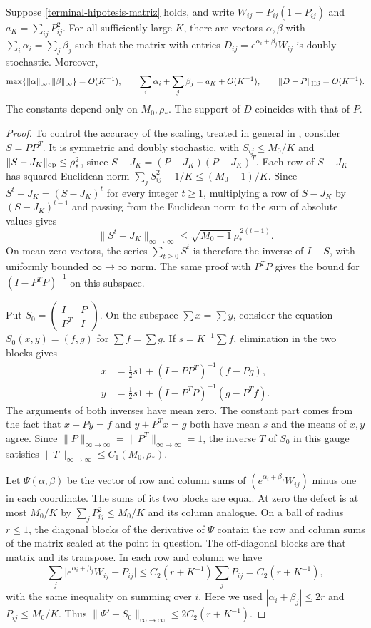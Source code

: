 \begin{lema}\label{terminal-escalado}
Suppose \eqref{terminal-hipotesis-matriz} holds, and write
$W_{ij}=P_{ij}(1-P_{ij})$ and $a_K=\sum_{ij}P_{ij}^2$. For all sufficiently large $K$, there are
vectors $\alpha,\beta$ with $\sum_i\alpha_i=\sum_j\beta_j$ such that the matrix with entries
$D_{ij}=e^{\alpha_i+\beta_j}W_{ij}$ is doubly stochastic. Moreover,
\[
 \max\{\|\alpha\|_\infty,\|\beta\|_\infty\}=O(K^{-1}),\qquad
 \sum_i\alpha_i+\sum_j\beta_j=a_K+O(K^{-1}),\qquad
 \|D-P\|_{\rm HS}=O(K^{-1}).
\]
The constants depend only on $M_0,\rho_*$. The support of $D$ coincides with that of $P$.
\end{lema}
\begin{proof}
To control the accuracy of the scaling, treated in general in \cite{sk}, consider $S=PP^T$.
It is symmetric and doubly stochastic, with $S_{ij}\le M_0/K$ and $\|S-J_K\|_{\rm op}\le\rho_*^2$,
since $S-J_K=(P-J_K)(P-J_K)^T$. Each row of $S-J_K$ has squared Euclidean norm
$\sum_j S_{ij}^2-1/K\le (M_0-1)/K$. Since $S^t-J_K=(S-J_K)^t$ for every integer $t\ge1$,
multiplying a row of $S-J_K$ by $(S-J_K)^{t-1}$ and passing from the Euclidean norm to the sum
of absolute values gives
\[
 \|S^t-J_K\|_{\infty\to\infty}
 \le \sqrt{M_0-1}\,\rho_*^{\,2(t-1)} .
\]
On mean-zero vectors, the series $\sum_{t\ge0}S^t$ is therefore the inverse of $I-S$, with
uniformly bounded $\infty\to\infty$ norm. The same proof with $P^TP$ gives the bound for
$(I-P^TP)^{-1}$ on this subspace.

Put $S_0=\left(\begin{smallmatrix}I&P\\P^T&I\end{smallmatrix}\right)$.
On the subspace $\sum x=\sum y$, consider the equation $S_0(x,y)=(f,g)$ for $\sum f=\sum g$.
If $s=K^{-1}\sum f$, elimination in the two blocks gives
\[
 \begin{aligned}
 x&=\tfrac12s\mathbf1+(I-PP^T)^{-1}(f-Pg),\\
 y&=\tfrac12s\mathbf1+(I-P^TP)^{-1}(g-P^Tf).
 \end{aligned}
\]
The arguments of both inverses have mean zero. The constant part comes from the fact that $x+Py=f$ and
$y+P^Tx=g$ both have mean $s$ and the means of $x,y$ agree. Since
$\|P\|_{\infty\to\infty}=\|P^T\|_{\infty\to\infty}=1$, the inverse $T$ of $S_0$ in this gauge
satisfies $\|T\|_{\infty\to\infty}\le C_1(M_0,\rho_*)$.

Let $\Psi(\alpha,\beta)$ be the vector of row and column sums of
$(e^{\alpha_i+\beta_j}W_{ij})$ minus one in each coordinate. The sums of its two blocks are
equal. At zero the defect is at most $M_0/K$ by $\sum_jP_{ij}^2\le M_0/K$ and its column
analogue. On a ball of radius $r\le1$, the diagonal blocks of the derivative of $\Psi$
contain the row and column sums of the matrix scaled at the point in question. The off-diagonal
blocks are that matrix and its transpose. In each row and column we have
\[
 \sum_j\big|e^{\alpha_i+\beta_j}W_{ij}-P_{ij}\big|
 \le C_2(r+K^{-1})\sum_jP_{ij}=C_2(r+K^{-1}),
\]
with the same inequality on summing over $i$. Here we used $|\alpha_i+\beta_j|\le2r$ and
$P_{ij}\le M_0/K$. Thus $\|\Psi'-S_0\|_{\infty\to\infty}\le 2C_2(r+K^{-1})$.


\end{proof}
